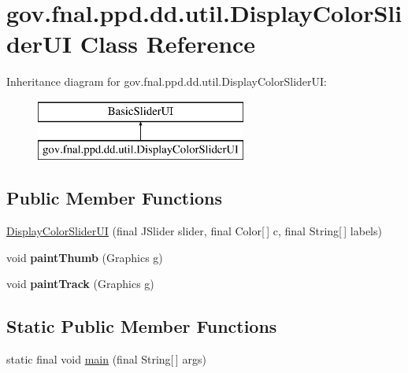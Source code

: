 \hypertarget{classgov_1_1fnal_1_1ppd_1_1dd_1_1util_1_1DisplayColorSliderUI}{\section{gov.\-fnal.\-ppd.\-dd.\-util.\-Display\-Color\-Slider\-U\-I Class Reference}
\label{classgov_1_1fnal_1_1ppd_1_1dd_1_1util_1_1DisplayColorSliderUI}
}
Inheritance diagram for gov.\-fnal.\-ppd.\-dd.\-util.\-Display\-Color\-Slider\-U\-I\-:\begin{figure}[H]
\begin{center}
\leavevmode
\includegraphics[height=2.000000cm]{classgov_1_1fnal_1_1ppd_1_1dd_1_1util_1_1DisplayColorSliderUI}
\end{center}
\end{figure}
\subsection*{Public Member Functions}
\begin{DoxyCompactItemize}
\item 
\hyperlink{classgov_1_1fnal_1_1ppd_1_1dd_1_1util_1_1DisplayColorSliderUI_af5a1118730ccaa1fcfacbfd5aee2639b}{Display\-Color\-Slider\-U\-I} (final J\-Slider slider, final Color\mbox{[}$\,$\mbox{]} c, final String\mbox{[}$\,$\mbox{]} labels)
\item 
\hypertarget{classgov_1_1fnal_1_1ppd_1_1dd_1_1util_1_1DisplayColorSliderUI_a56976b17434c91683f08a2fdc8050298}{void {\bfseries paint\-Thumb} (Graphics g)}\label{classgov_1_1fnal_1_1ppd_1_1dd_1_1util_1_1DisplayColorSliderUI_a56976b17434c91683f08a2fdc8050298}

\item 
\hypertarget{classgov_1_1fnal_1_1ppd_1_1dd_1_1util_1_1DisplayColorSliderUI_a50ba5c92e6d6092f1114a72d2548d57e}{void {\bfseries paint\-Track} (Graphics g)}\label{classgov_1_1fnal_1_1ppd_1_1dd_1_1util_1_1DisplayColorSliderUI_a50ba5c92e6d6092f1114a72d2548d57e}

\end{DoxyCompactItemize}
\subsection*{Static Public Member Functions}
\begin{DoxyCompactItemize}
\item 
static final void \hyperlink{classgov_1_1fnal_1_1ppd_1_1dd_1_1util_1_1DisplayColorSliderUI_a2a37edccb82c9a4241a6c58e7a4c5e0a}{main} (final String\mbox{[}$\,$\mbox{]} args)
\end{DoxyCompactItemize}
